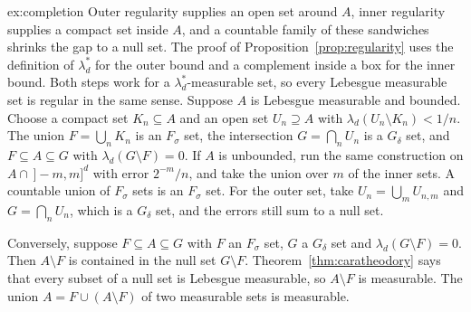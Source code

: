 \begin{solution}{ex:completion}
\idea Outer regularity supplies an open set around $A$, inner regularity supplies a compact set inside $A$, and a countable family of these sandwiches shrinks the gap to a null set.
\writeup The proof of Proposition~\ref{prop:regularity} uses the definition of $\lambda_d^*$ for the outer bound and a complement inside a box for the inner bound.
Both steps work for a $\lambda_d^*$-measurable set, so every Lebesgue measurable set is regular in the same sense.
Suppose $A$ is Lebesgue measurable and bounded.
Choose a compact set $K_n\subseteq A$ and an open set $U_n\supseteq A$ with $\lambda_d(U_n\setminus K_n)<1/n$.
The union $F=\bigcup_n K_n$ is an $F_\sigma$ set, the intersection $G=\bigcap_n U_n$ is a $G_\delta$ set, and $F\subseteq A\subseteq G$ with $\lambda_d(G\setminus F)=0$.
If $A$ is unbounded, run the same construction on $A\cap\,]-m,m]^d$ with error $2^{-m}/n$, and take the union over $m$ of the inner sets.
A countable union of $F_\sigma$ sets is an $F_\sigma$ set.
For the outer set, take $U_n=\bigcup_m U_{n,m}$ and $G=\bigcap_n U_n$, which is a $G_\delta$ set, and the errors still sum to a null set.

Conversely, suppose $F\subseteq A\subseteq G$ with $F$ an $F_\sigma$ set, $G$ a $G_\delta$ set and $\lambda_d(G\setminus F)=0$.
Then $A\setminus F$ is contained in the null set $G\setminus F$.
Theorem~\ref{thm:caratheodory} says that every subset of a null set is Lebesgue measurable, so $A\setminus F$ is measurable.
The union $A=F\cup(A\setminus F)$ of two measurable sets is measurable.
\end{solution}

